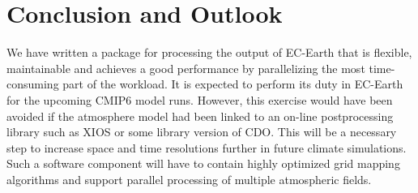 \documentclass[procedia]{easychair}
\begin{document}
\section{Conclusion and Outlook}
We have written a package for processing the output of EC-Earth that is 
flexible, maintainable and achieves a good performance by parallelizing the 
most time-consuming part of the workload. It is expected to perform its duty in 
EC-Earth for the upcoming CMIP6 model runs. However, this exercise would have 
been avoided if the atmosphere model had been linked to an on-line 
postprocessing library such as XIOS or some library version of CDO. This will 
be a necessary step to increase space and time resolutions further in future 
climate simulations. Such a software component will have to contain highly 
optimized grid mapping algorithms and support parallel processing of multiple 
atmospheric fields.


%
\label{sect:bib}

%
%
%


\end{document}
